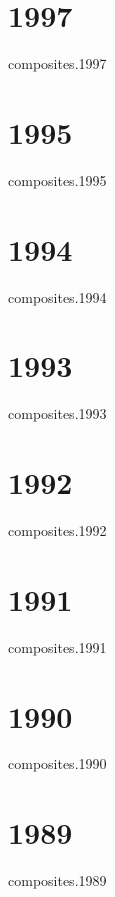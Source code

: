 \documentclass[12pt]{article}
\begin{document}
\section*{1997}
\begin{btSect}{composites.1997}
\btPrintAll
\end{btSect}
%
%
\section*{1995}
\begin{btSect}{composites.1995}
\btPrintAll
\end{btSect}
%
\section*{1994}
\begin{btSect}{composites.1994}
\btPrintAll
\end{btSect}
%
\section*{1993}
\begin{btSect}{composites.1993}
\btPrintAll
\end{btSect}
%
\section*{1992}
\begin{btSect}{composites.1992}
\btPrintAll
\end{btSect}
%
\section*{1991}
\begin{btSect}{composites.1991}
\btPrintAll
\end{btSect}
%
\section*{1990}
\begin{btSect}{composites.1990}
\btPrintAll
\end{btSect}

\section*{1989}
\begin{btSect}{composites.1989}
\btPrintAll
\end{btSect}
%
\end{document}
